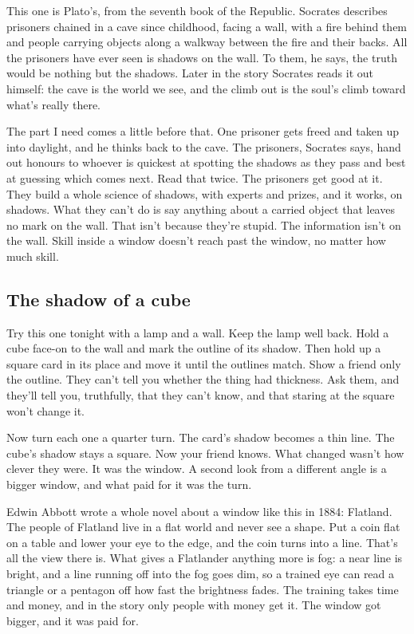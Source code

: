 \documentclass[11pt,twoside]{article}
\theoremstyle{thielethm}
\theoremstyle{thieledef}
\theoremstyle{thieledef}
\theoremstyle{thieledef}
\theoremstyle{thielethm}
\theoremstyle{thieleobs}
\theoremstyle{thielethm}
\begin{document}
This one is Plato's, from the seventh book of the Republic. Socrates describes prisoners chained in a cave since childhood, facing a wall, with a fire behind them and people carrying objects along a walkway between the fire and their backs. All the prisoners have ever seen is shadows on the wall. To them, he says, the truth would be nothing but the shadows. Later in the story Socrates reads it out himself: the cave is the world we see, and the climb out is the soul's climb toward what's really there.

The part I need comes a little before that. One prisoner gets freed and taken up into daylight, and he thinks back to the cave. The prisoners, Socrates says, hand out honours to whoever is quickest at spotting the shadows as they pass and best at guessing which comes next. Read that twice. The prisoners get good at it. They build a whole science of shadows, with experts and prizes, and it works, on shadows. What they can't do is say anything about a carried object that leaves no mark on the wall. That isn't because they're stupid. The information isn't on the wall. Skill inside a window doesn't reach past the window, no matter how much skill.

\subsection{The shadow of a cube}

Try this one tonight with a lamp and a wall. Keep the lamp well back. Hold a cube face-on to the wall and mark the outline of its shadow. Then hold up a square card in its place and move it until the outlines match. Show a friend only the outline. They can't tell you whether the thing had thickness. Ask them, and they'll tell you, truthfully, that they can't know, and that staring at the square won't change it.

Now turn each one a quarter turn. The card's shadow becomes a thin line. The cube's shadow stays a square. Now your friend knows. What changed wasn't how clever they were. It was the window. A second look from a different angle is a bigger window, and what paid for it was the turn.

Edwin Abbott wrote a whole novel about a window like this in 1884: Flatland. The people of Flatland live in a flat world and never see a shape. Put a coin flat on a table and lower your eye to the edge, and the coin turns into a line. That's all the view there is. What gives a Flatlander anything more is fog: a near line is bright, and a line running off into the fog goes dim, so a trained eye can read a triangle or a pentagon off how fast the brightness fades. The training takes time and money, and in the story only people with money get it. The window got bigger, and it was paid for.
\end{document}
